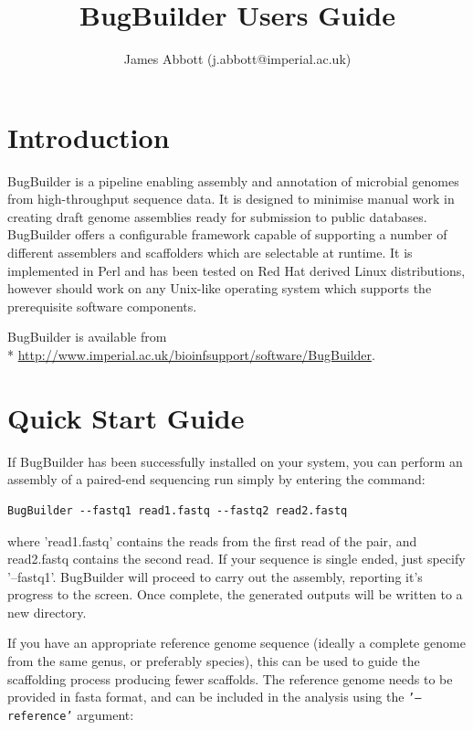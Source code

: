 \documentclass[a4paper,10pt]{article}
\title{BugBuilder Users Guide}
\author{James Abbott (j.abbott@imperial.ac.uk)}
\date{}
\begin{document}
\maketitle
\tableofcontents
\newpage
\graphicspath{ {images/} }

\section{Introduction}

BugBuilder is a pipeline enabling assembly and annotation of microbial genomes from high-throughput
sequence data. It is designed to minimise manual work in creating draft genome assemblies ready for
submission to public databases.  BugBuilder offers a configurable framework capable of supporting a
number of different assemblers and scaffolders which are selectable at runtime. It is implemented
in Perl and has been tested on Red Hat derived Linux distributions, however should work on any
Unix-like operating system which supports the prerequisite software components.


BugBuilder is available from \\*
\url{http://www.imperial.ac.uk/bioinfsupport/software/BugBuilder}. 

\section{Quick Start Guide}

If BugBuilder has been successfully installed on your system, you can perform an assembly of a
paired-end sequencing run simply by entering the command:

\begin{verbatim}
BugBuilder --fastq1 read1.fastq --fastq2 read2.fastq
\end{verbatim}

where 'read1.fastq' contains the reads from the first read of the pair, and read2.fastq contains
the second read.  If your sequence is single ended, just specify '--fastq1'.  BugBuilder will
proceed to carry out the assembly, reporting it's progress to the screen. Once complete, the
generated outputs will be written to a new directory. 

If you have an appropriate reference genome sequence (ideally a complete genome from the same
genus, or preferably species), this can be used to guide the scaffolding process producing fewer
scaffolds. The reference genome needs to be provided in fasta format, and can be included in the
analysis using the {\tt '--reference'} argument:
\end{document}
